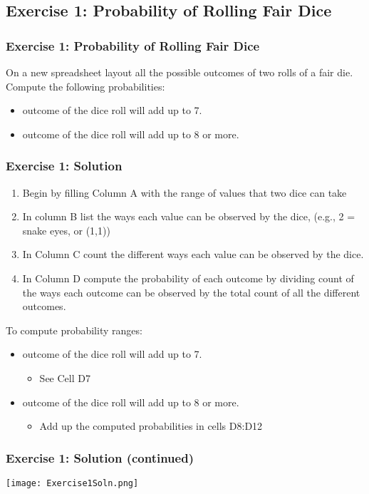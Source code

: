 \documentclass[12pt]{beamer}
\begin{document}
\subsection{Exercise 1: Probability of Rolling Fair Dice}
	\begin{frame}
		\frametitle{Exercise 1: Probability of Rolling Fair Dice}
		On a new spreadsheet layout all the possible outcomes of two rolls of a fair die.\\
		Compute the following probabilities:
		\begin{itemize}
			\item outcome of the dice roll will add up to 7.
			\item outcome of the dice roll will add up to 8 or more.
		\end{itemize}
	\end{frame}
	\begin{frame}
		\frametitle{Exercise 1: Solution}
		\begin{enumerate} 
			\item Begin by filling Column A with the range of values that two dice can take
			\item In column B list the ways each value can be observed by the dice, (e.g., 2 = snake eyes, or (1,1)) 
			\item In Column C count the different ways each value can be observed by the dice.
			\item In Column D compute the probability of each outcome by dividing count of the ways each outcome can be observed by the total count of all the different outcomes.
		\end{enumerate}			
		To compute probability ranges:
		\begin{itemize}
			\item  outcome of the dice roll will add up to 7.
			\begin{itemize}
				\item See Cell D7
			\end{itemize}
			\item outcome of the dice roll will add up to 8 or more.
			\begin{itemize}
				\item Add up the computed probabilities in cells D8:D12
			\end{itemize}
		\end{itemize}
	\end{frame}
	\begin{frame}
		\frametitle{Exercise 1: Solution (continued)}
		\begin{center}
			\texttt{[image: Exercise1Soln.png]}
		\end{center}
	\end{frame}
\end{document}
